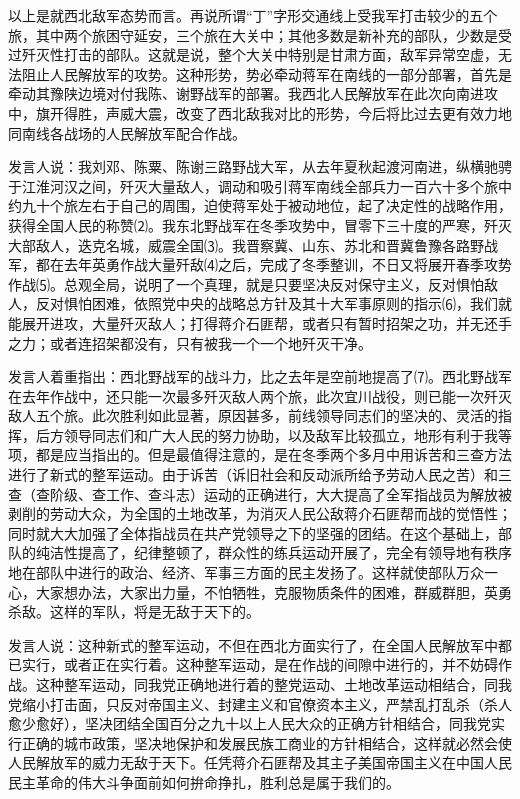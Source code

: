 \documentclass[UTF-8, a5paper, 12pt]{ctexart}
\begin{document}
以上是就西北敌军态势而言。再说所谓“丁”字形交通线上受我军打击较少的五个旅，其中两个旅困守延安，三个旅在大关中；其他多数是新补充的部队，少数是受过歼灭性打击的部队。这就是说，整个大关中特别是甘肃方面，敌军异常空虚，无法阻止人民解放军的攻势。这种形势，势必牵动蒋军在南线的一部分部署，首先是牵动其豫陕边境对付我陈、谢野战军的部署。我西北人民解放军在此次向南进攻中，旗开得胜，声威大震，改变了西北敌我对比的形势，今后将比过去更有效力地同南线各战场的人民解放军配合作战。

发言人说：我刘邓、陈粟、陈谢三路野战大军，从去年夏秋起渡河南进，纵横驰骋于江淮河汉之间，歼灭大量敌人，调动和吸引蒋军南线全部兵力一百六十多个旅中约九十个旅左右于自己的周围，迫使蒋军处于被动地位，起了决定性的战略作用，获得全国人民的称赞⑵。我东北野战军在冬季攻势中，冒零下三十度的严寒，歼灭大部敌人，迭克名城，威震全国⑶。我晋察冀、山东、苏北和晋冀鲁豫各路野战军，都在去年英勇作战大量歼敌⑷之后，完成了冬季整训，不日又将展开春季攻势作战⑸。总观全局，说明了一个真理，就是只要坚决反对保守主义，反对惧怕敌人，反对惧怕困难，依照党中央的战略总方针及其十大军事原则的指示⑹，我们就能展开进攻，大量歼灭敌人；打得蒋介石匪帮，或者只有暂时招架之功，并无还手之力；或者连招架都没有，只有被我一个一个地歼灭干净。

发言人着重指出：西北野战军的战斗力，比之去年是空前地提高了⑺。西北野战军在去年作战中，还只能一次最多歼灭敌人两个旅，此次宜川战役，则已能一次歼灭敌人五个旅。此次胜利如此显著，原因甚多，前线领导同志们的坚决的、灵活的指挥，后方领导同志们和广大人民的努力协助，以及敌军比较孤立，地形有利于我等项，都是应当指出的。但是最值得注意的，是在冬季两个多月中用诉苦和三查方法进行了新式的整军运动。由于诉苦（诉旧社会和反动派所给予劳动人民之苦）和三查（查阶级、查工作、查斗志）运动的正确进行，大大提高了全军指战员为解放被剥削的劳动大众，为全国的土地改革，为消灭人民公敌蒋介石匪帮而战的觉悟性；同时就大大加强了全体指战员在共产党领导之下的坚强的团结。在这个基础上，部队的纯洁性提高了，纪律整顿了，群众性的练兵运动开展了，完全有领导地有秩序地在部队中进行的政治、经济、军事三方面的民主发扬了。这样就使部队万众一心，大家想办法，大家出力量，不怕牺牲，克服物质条件的困难，群威群胆，英勇杀敌。这样的军队，将是无敌于天下的。

发言人说：这种新式的整军运动，不但在西北方面实行了，在全国人民解放军中都已实行，或者正在实行着。这种整军运动，是在作战的间隙中进行的，并不妨碍作战。这种整军运动，同我党正确地进行着的整党运动、土地改革运动相结合，同我党缩小打击面，只反对帝国主义、封建主义和官僚资本主义，严禁乱打乱杀（杀人愈少愈好），坚决团结全国百分之九十以上人民大众的正确方针相结合，同我党实行正确的城市政策，坚决地保护和发展民族工商业的方针相结合，这样就必然会使人民解放军的威力无敌于天下。任凭蒋介石匪帮及其主子美国帝国主义在中国人民民主革命的伟大斗争面前如何拚命挣扎，胜利总是属于我们的。
\end{document}
